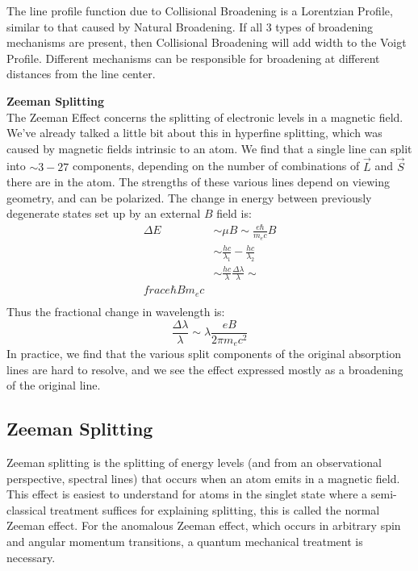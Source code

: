 \documentclass{article}
\begin{document}
The line profile function due to Collisional Broadening is a Lorentzian Profile, similar to that caused by Natural Broadening. If all 3 types of broadening mechanisms are present, then Collisional Broadening will add width to the Voigt Profile. Different mechanisms can be responsible for broadening at different distances from the line center.

\textbf{ Zeeman Splitting}\\

The Zeeman Effect concerns the splitting of electronic levels in a magnetic
field.  We've already talked a little bit about this in hyperfine 
splitting, which was caused by magnetic fields intrinsic to an atom.  We find
that a single line can split into $\sim3-27$ components, depending on the 
number of combinations of $\vec L$ and $\vec S$ there are in the atom.  The
strengths of these various lines depend on viewing geometry, and can be
polarized.  The change in energy between previously degenerate states set up
by an external $B$ field is:
$$\begin{aligned}\Delta E&\sim\mu B\sim\frac{e\hbar}{ m_ec}B\\ 
&\sim\frac{hc}{\lambda_1}-\frac{hc}{\lambda_2}\\ 
&\sim\frac{hc}{\lambda}\frac{\Delta\lambda}{\lambda}\sim\\frac{e\hbar B}{ m_ec}\\ \end{aligned}$$
Thus the fractional change in wavelength is:
$$\boxed{\frac{\Delta\lambda}{\lambda}\sim\lambda\frac{eB}{2\pi m_ec^2}}$$
In practice, we find that the various split components of the original
absorption lines are hard to resolve, and we see the effect expressed mostly
as a broadening of the original line.



\subsection{Zeeman Splitting}

 Zeeman splitting is the splitting of energy levels (and from an observational perspective, spectral lines) that occurs when an atom emits in a magnetic field. This effect is easiest to understand for atoms in the singlet state where a semi-classical treatment suffices for explaining splitting, this is called the normal Zeeman effect. For the anomalous Zeeman effect, which occurs in arbitrary spin and angular momentum transitions, a quantum mechanical treatment is necessary.   
 
\end{document}
